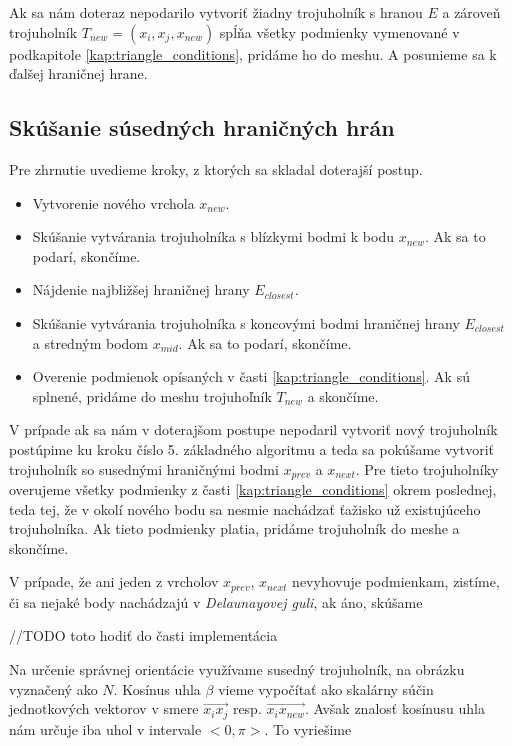 Ak sa nám doteraz nepodarilo vytvoriť žiadny trojuholník s hranou $E$ a zároveň trojuholník 
$T_{new} = (x_i, x_j, x_{new})$ spĺňa všetky podmienky vymenované v podkapitole 
\ref{kap:triangle_conditions}, pridáme ho do meshu. A posunieme sa k ďalšej hraničnej hrane.

\subsection{Skúšanie súsedných hraničných hrán}
Pre zhrnutie uvedieme kroky, z ktorých sa skladal doterajší postup.
\begin{itemize}
\item{
    Vytvorenie nového vrchola $x_{new}$.
}
\item{
    Skúšanie vytvárania trojuholníka s blízkymi bodmi k bodu $x_{new}$.
    Ak sa to podarí, skončíme. 
}
\item{
    Nájdenie najbližšej hraničnej hrany $E_{closest}$.
}
\item{
    Skúšanie vytvárania trojuholníka s koncovými bodmi hraničnej hrany $E_{closest}$ a 
    stredným bodom $x_{mid}$. Ak sa to podarí, skončíme.
}
\item{
    Overenie podmienok opísaných v časti \ref{kap:triangle_conditions}. Ak sú splnené, pridáme do 
    meshu trojuhoľník $T_{new}$ a skončíme.
}
\end{itemize}

V prípade ak sa nám v doterajšom postupe nepodaril vytvoriť nový trojuholník postúpime ku kroku 
číslo 5. základného algoritmu a teda sa pokúšame vytvoriť trojuholník so susednými hraničnými bodmi 
$x_{prev}$ a $x_{next}$. Pre tieto trojuholníky overujeme všetky podmienky z časti 
\ref{kap:triangle_conditions} okrem poslednej, teda tej, že v okolí nového bodu sa nesmie 
nachádzať ťažisko už existujúceho trojuholníka. Ak tieto podmienky platia, pridáme trojuholník 
do meshe a skončíme.

V prípade, že ani jeden z vrcholov $x_{prev}$, $x_{next}$ nevyhovuje podmienkam, zistíme, 
či sa nejaké body nachádzajú v \textit{Delaunayovej guli}, ak áno, skúšame 



    //TODO toto hodiť do časti implementácia
    
    Na určenie správnej orientácie využívame susedný trojuholník, na obrázku vyznačený 
    ako $N$. Kosínus uhla $\beta$ vieme vypočítať ako skalárny súčin jednotkových vektorov 
    v smere $\overrightarrow{x_i x_j}$ resp. $\overrightarrow{x_i x_{new}}$. 
    Avšak znalosť kosínusu uhla nám určuje iba uhol v intervale $<0, \pi>$. To vyriešime 
